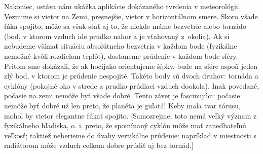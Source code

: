 \documentclass[a4paper]{article}
\begin{document}
Nakoniec, ostáva nám ukážka aplikácie dokázaného tvrdenia v meteorológii. Vezmime si vietor na Zemi, presnejšie, vietor v horizontálnom smere. Skoro všade fúka spojito, môže sa však stať aj to, že niekde máme bezvetrie alebo tornádo (bod, v ktorom vzduch ide prudko nahor a je vťahovaný z~okolia). Ak si nebudeme všímať situáciu absolútneho bezvetria v každom bode (fyzikálne nemožné kvôli rozdielom teplôt), dostaneme prúdenie v každom bode sféry. Pritom sme dokázali, že ak hocijako orientujeme šípky, bude na sfére aspoň jeden zlý bod, v ktorom je prúdenie nespojité. Takéto body sú dvoch druhov: tornáda a cyklóny (pokojné oko v strede a prudko prúdiaci vzduch dookola). Inak povedané, počasie na zemi nemôže byť všade dobré. Tento záver je fascinujúci: počasie nemôže byť dobré už len preto, že planéta je guľatá! Keby mala tvar tórusu, mohol by vietor elegantne fúkať spojito. [Samozrejme, toto nemá veľký význam z fyzikálneho hľadiska, o. i. preto, že spomínaný cyklón môže mať zanedbateľnú veľkosť; taktiež neberieme do úvahy vertikálne prúdenie: napríklad v miestnosti s radiátorom môže vzduch celkom dobre prúdiť aj bez tornád.]
\end{document}
